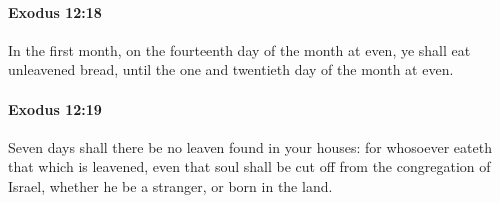 		\paragraph{Exodus 12:18} %
			\label{EXODUS-12-18}

			In the first month, on the fourteenth day of the month at even, ye shall eat unleavened bread, until the one and twentieth day of the month at even.


		\paragraph{Exodus 12:19} %
			\label{EXODUS-12-19}

			Seven days shall there be no leaven found in your houses: for whosoever eateth that which is leavened, even that soul shall be cut off from the congregation of Israel, whether he be a stranger, or born in the land.


